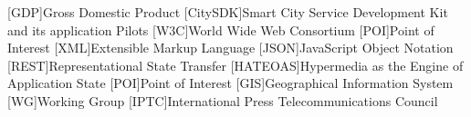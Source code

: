 [GDP]{Gross Domestic Product}
[CitySDK]{Smart City Service Development Kit and its application Pilots}
[W3C]{World Wide Web Consortium}
[POI]{Point of Interest}
[XML]{Extensible Markup Language}
[JSON]{JavaScript Object Notation}
[REST]{Representational State Transfer}
[HATEOAS]{Hypermedia as the Engine of Application State}
[POI]{Point of Interest}
[GIS]{Geographical Information System}
[WG]{Working Group}
[IPTC]{International Press Telecommunications Council}
